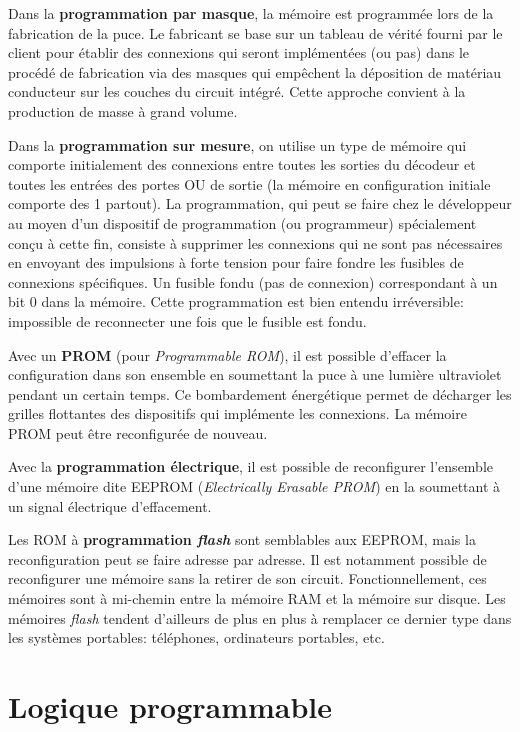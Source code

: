 \documentclass[11pt]{article}
\begin{document}
Dans la \textbf{programmation par masque}, la mémoire est programmée lors de
la fabrication de la puce. Le fabricant se base sur un tableau de
vérité fourni par le client pour établir des connexions qui seront
implémentées (ou pas) dans le procédé de fabrication via des masques
qui empêchent la déposition de matériau conducteur sur les couches du
circuit intégré.  Cette approche convient à la production de masse à
grand volume.

Dans la \textbf{programmation sur mesure}, on utilise un type de mémoire qui
comporte initialement des connexions entre toutes les sorties du
décodeur et toutes les entrées des portes OU de sortie (la mémoire en
configuration initiale comporte des 1 partout). La programmation, qui
peut se faire chez le développeur au moyen d'un dispositif de
programmation (ou programmeur) spécialement conçu à cette fin,
consiste à supprimer les connexions qui ne sont pas nécessaires en
envoyant des impulsions à forte tension pour faire fondre les fusibles
de connexions spécifiques. Un fusible fondu (pas de connexion)
correspondant à un bit 0 dans la mémoire. Cette programmation est
bien entendu irréversible: impossible de reconnecter une fois que le
fusible est fondu.

Avec un \textbf{PROM} (pour \emph{Programmable ROM}), il est possible d'effacer la
configuration dans son ensemble en soumettant la puce à une lumière
ultraviolet pendant un certain temps. Ce bombardement énergétique
permet de décharger les grilles flottantes des dispositifs qui
implémente les connexions. La mémoire PROM peut être reconfigurée de
nouveau.

Avec la \textbf{programmation électrique}, il est possible de reconfigurer
l'ensemble d'une mémoire dite EEPROM (\emph{Electrically Erasable PROM})
en la soumettant à un signal électrique d'effacement. 

Les ROM à \textbf{programmation \emph{flash}} sont semblables aux EEPROM, mais la
reconfiguration peut se faire adresse par adresse.  Il est notamment
possible de reconfigurer une mémoire sans la retirer de son circuit.
Fonctionnellement, ces mémoires sont à mi-chemin entre la mémoire RAM
et la mémoire sur disque. Les mémoires \emph{flash} tendent d'ailleurs de
plus en plus à remplacer ce dernier type dans les systèmes portables:
téléphones, ordinateurs portables, etc.

\section{Logique programmable}
\label{sec:orga694642}
\end{document}
